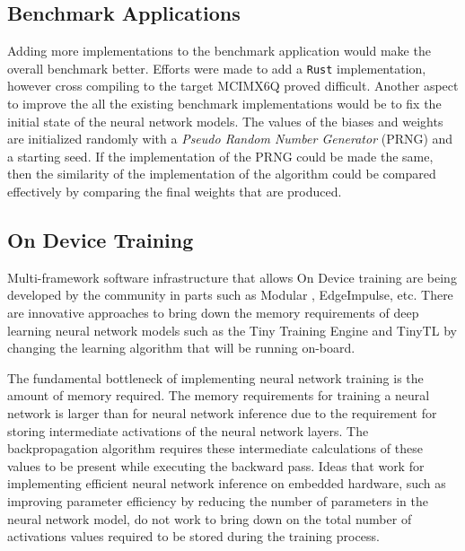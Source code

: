\subsection{Benchmark Applications}

Adding more implementations to the benchmark application would make the overall benchmark better. Efforts were made to add a \texttt{Rust} implementation, however cross compiling to the target MCIMX6Q proved difficult. Another aspect to improve the all the existing benchmark implementations would be to fix the initial state of the neural network models. The values of the biases and weights are initialized randomly with a \textit{Pseudo Random Number Generator} (PRNG) and a starting seed. If the implementation of the PRNG could be made the same, then the similarity of the implementation of the algorithm could be compared effectively by comparing the final weights that are produced.

\subsection{On Device Training}

Multi-framework software infrastructure that allows On Device training are being developed by the community in parts such as Modular \cite{mojo}, EdgeImpulse, etc. There are innovative approaches to bring down the memory requirements of deep learning neural network models such as the Tiny Training Engine \cite{lin2022ondevice} and TinyTL \cite{cai2021tinytl} by changing the learning algorithm that will be running on-board.

The fundamental bottleneck of implementing neural network training is the amount of memory required. The memory requirements for training a neural network is larger than for neural network inference due to the requirement for storing intermediate activations of the neural network layers. The backpropagation algorithm requires these intermediate calculations of these values to be present while executing the backward pass. Ideas that work for implementing efficient neural network inference on embedded hardware, such as improving parameter efficiency by reducing the number of parameters in the neural network model, do not work to bring down on the total number of activations values required to be stored during the training process.
